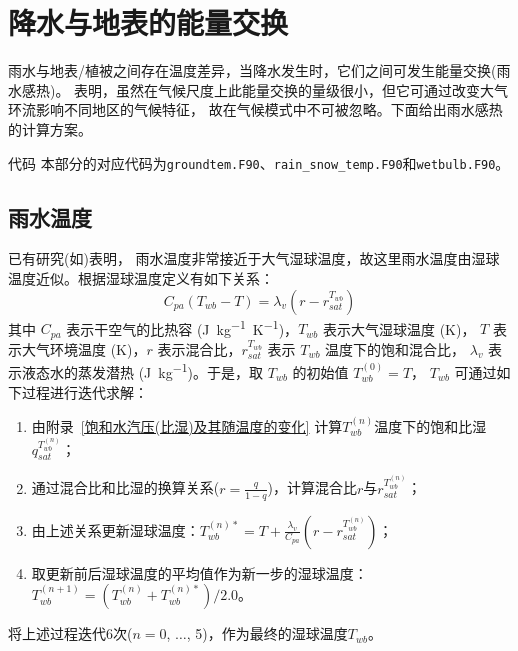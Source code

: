 \chapter{降水与地表的能量交换}

雨水与地表/植被之间存在温度差异，当降水发生时，它们之间可发生能量交换(雨水感热)。
\citet{wei2014impact} 表明，虽然在气候尺度上此能量交换的量级很小，但它可通过改变大气环流影响不同地区的气候特征，
故在气候模式中不可被忽略。下面给出雨水感热的计算方案。
\begin{mymdframed}{代码}
本部分的对应代码为\texttt{groundtem.F90}、\texttt{rain\_snow\_temp.F90}和\texttt{wetbulb.F90}。
\end{mymdframed}


\section{雨水温度}\label{雨水温度}
已有研究(如\citet{anderson1998moored})表明，
雨水温度非常接近于大气湿球温度，故这里雨水温度由湿球温度近似。根据湿球温度定义有如下关系：
\begin{equation}
C_{p a}\left(T_{w b}-T\right)=\lambda_{v}\left(r-r_{s a t}^{T_{w b}}\right)
\end{equation}
其中 $C_{pa}$ 表示干空气的比热容 (\unit{J.kg^{-1}.K^{-1}})，$T_{wb}$ 表示大气湿球温度 (K)，
$T$ 表示大气环境温度 (K)，$r$ 表示混合比，$r_{sat}^{T_{wb}}$ 表示 $T_{wb}$ 温度下的饱和混合比，
$\lambda_v$ 表示液态水的蒸发潜热 (\unit{J.kg^{-1}})。于是，取 $T_{wb}$ 的初始值 $T_{wb}^{\left(0\right)}=T$，
$T_{wb}$ 可通过如下过程进行迭代求解：
\begin{enumerate}
    \item 由附录~\ref{饱和水汽压(比湿)及其随温度的变化} 计算$T_{wb}^{\left(n\right)}$温度下的饱和比湿$q_{sat}^{T_{wb}^{\left(n\right)}}$；
    \item 通过混合比和比湿的换算关系($r=\frac{q}{1-q}$)，计算混合比$r$与$r_{sat}^{T_{wb}^{\left(n\right)}}$；
    \item 由上述关系更新湿球温度：$T_{wb}^{\left(n\right)\ast}=T+\frac{\lambda_v}{C_{pa}}\left(r-r_{sat}^{T_{wb}^{\left(n\right)}}\right)$；
    \item 取更新前后湿球温度的平均值作为新一步的湿球温度：$T_{wb}^{\left(n+1\right)}=\left(T_{wb}^{\left(n\right)}+T_{wb}^{\left(n\right)\ast}\right)/2.0$。
\end{enumerate}
将上述过程迭代6次($n=0$, $\ldots$, 5)，作为最终的湿球温度$T_{wb}$。



